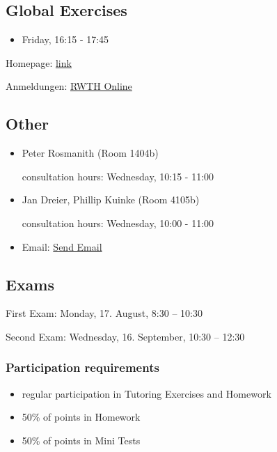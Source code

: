 \documentclass[
]{article}
\providecommand{\tightlist}{%
  \setlength{\itemsep}{0pt}\setlength{\parskip}{0pt}}
\begin{document}
\hypertarget{global-exercises}{%
\subsection{Global Exercises}\label{global-exercises}}

\begin{itemize}
\tightlist
\item
  Friday, 16:15 - 17:45
\end{itemize}

Homepage: \href{https://tcs.rwth-aachen.de/lehre/FSAP/SS2020}{link}

Anmeldungen: \href{https://online.rwth-aachen.de}{RWTH Online}

\hypertarget{other}{%
\subsection{Other}\label{other}}

\begin{itemize}
\item
  Peter Rosmanith (Room 1404b)

  consultation hours: Wednesday, 10:15 - 11:00
\item
  Jan Dreier, Phillip Kuinke (Room 4105b)

  consultation hours: Wednesday, 10:00 - 11:00
\item
  Email: \href{mailto://tcs-teaching@cs.rwth-aachen.de}{Send Email}
\end{itemize}

\hypertarget{exams}{%
\subsection{Exams}\label{exams}}

First Exam: Monday, 17. August, 8:30 -- 10:30

Second Exam: Wednesday, 16. September, 10:30 -- 12:30

\hypertarget{participation-requirements}{%
\subsubsection{Participation
requirements}\label{participation-requirements}}

\begin{itemize}
\tightlist
\item
  regular participation in Tutoring Exercises and Homework
\item
  50\% of points in Homework
\item
  50\% of points in Mini Tests
\end{itemize}
\end{document}
